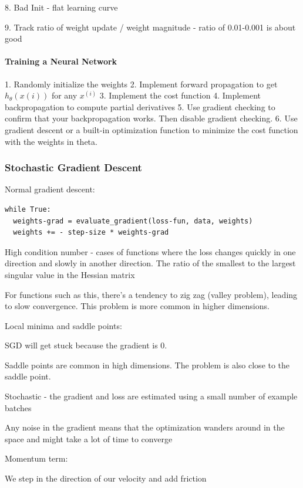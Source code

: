 8. Bad Init - flat learning curve

9. Track ratio of weight update / weight magnitude - ratio of 0.01-0.001 is about good

\paragraph{Training a Neural Network}

1. Randomly initialize the weights
2. Implement forward propagation to get $h_\theta(x(i))$  for any $x^{(i)}$
3. Implement the cost function
4. Implement backpropagation to compute partial derivatives
5. Use gradient checking to confirm that your backpropagation works. Then disable gradient checking.
6. Use gradient descent or a built-in optimization function to minimize the cost function with the weights in theta.

\subsubsection{Stochastic Gradient Descent}

Normal gradient descent:

\begin{verbatim}
while True:
  weights-grad = evaluate_gradient(loss-fun, data, weights)
  weights += - step-size * weights-grad
\end{verbatim}


High condition number - cases of functions where the loss changes quickly in one direction and slowly in another direction. The ratio of the smallest to the largest singular value in the Hessian matrix

For functions such as this, there's a tendency to zig zag (valley problem), leading to slow convergence. This problem is more common in higher dimensions.

Local minima and saddle points:

SGD will get stuck because the gradient is 0.

Saddle points are common in high dimensions. The problem is also close to the saddle point.

Stochastic - the gradient and loss are estimated using a small number of example batches

Any noise in the gradient means that the optimization wanders around in the space and might take a lot of time to converge

Momentum term:

We step in the direction of our velocity and add friction

